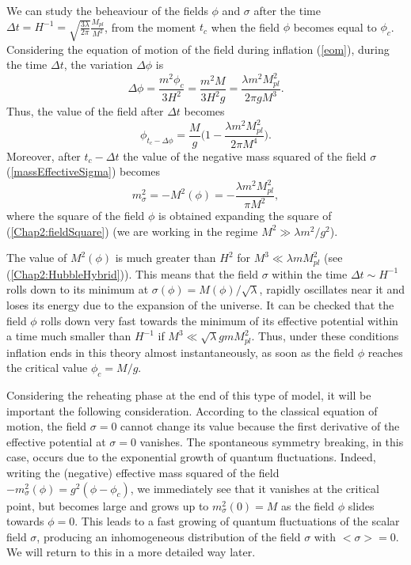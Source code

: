 \documentclass[11pt,a4paper,twoside]{book}
\begin{document}
We can study the beheaviour of the fields $\phi$ and $\sigma$ after the time 
$ \Delta t = H^{-1}=\sqrt{\frac{3\lambda}{2\pi}}\frac{M_{pl}}{M^{2}} $, from the moment $ t_{c} $ when the field $\phi$ becomes equal to $\phi_{c}$.
Considering the equation of motion of the field during inflation (\ref{eom}), during the time $\Delta t$, the variation $\Delta \phi$ is
\begin{equation}
	\label{Chap2:variationDeltaPhi}
	\Delta \phi = \frac{m^{2} \phi_{c}}{3H^{2}} = \frac{m^{2}M}{3H^{2}g} = \frac{\lambda m^{2}M_{pl}^{2}}{2\pi gM^{3}}.
\end{equation}
Thus, the value of the field after $\Delta t$ becomes
\begin{equation}
	\label{Chap2:fieldSquare}
	\phi_{t_{c}-\Delta\phi}=\frac{M}{g}\Big (1-\frac{\lambda m^{2} M^{2}_{pl}} {2\pi M^{4}} \Big ).
\end{equation}
Moreover, after $ t_{c} - \Delta t $ the value of the negative mass squared of the field $\sigma$ (\ref{massEffectiveSigma}) becomes
\begin{equation}
	\label{Chap2}
	m^{2}_{\sigma} = - M^{2}(\phi) = - \frac{\lambda m^{2}M^{2}_{pl}}{\pi M^{2}}, 
\end{equation}
where the square of the field $\phi$ is obtained expanding the square of (\ref{Chap2:fieldSquare}) (we are working in the regime $ M^{2} \gg \lambda m^{2}/g^{2} $).

The value of $ M^{2}(\phi) $ is much greater than $ H^{2} $ for $ M^{3} \ll \lambda m M_{pl}^{2} $ (see (\ref{Chap2:HubbleHybrid})). This means that the field $\sigma$ within the time $\Delta t \sim H^{-1} $ rolls down to its minimum at $\sigma (\phi) = M(\phi)/\sqrt{\lambda}$, rapidly oscillates near it and loses its energy  due to the expansion of the universe.
It can be checked that the field $\phi$ rolls down very fast towards the minimum of its effective potential within a time much smaller than $ H^{-1} $ if $ M^{3} \ll \sqrt{\lambda}gmM_{pl}^{2} $.
Thus, under these conditions inflation ends in this theory almost instantaneously, as soon as the field $\phi$ reaches the critical value $\phi_{c} = M/g$.

Considering the reheating phase at the end of this type of model, it will be important the following consideration. According to the classical equation of motion, the field $ \sigma=0 $ cannot change its value because the first derivative of the effective potential at $\sigma=0$ vanishes. The spontaneous symmetry breaking,  in this case, occurs due to the exponential growth of quantum fluctuations. Indeed, writing the (negative) effective mass squared of the field $ -m^{2}_{\sigma}(\phi)=g^{2}(\phi-\phi_{c}) $, we immediately see that it vanishes at the critical point, but becomes large and grows up to $ m^{2}_{\sigma}(0) = M $ as the field $\phi$ slides towards $\phi=0$. This leads to a fast growing of quantum fluctuations of the scalar field $\sigma$, producing an inhomogeneous distribution of the field $\sigma$ with $ <\sigma>=0 $. We will return to this in a more detailed way later. 
\end{document}
